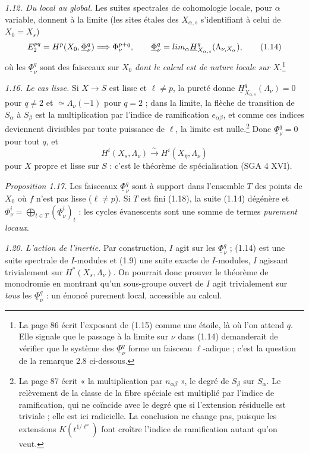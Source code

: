 \documentclass[11pt,a4paper]{article}
\begin{document}
\emph{1.12. Du local au global.} Les suites spectrales de cohomologie locale,
pour $\alpha$ variable, donnent à la limite (les sites étales des
$X_{\alpha,s}$ s'identifiant à celui de $X_0 = X_s$)
\[
  E_2^{pq} = H^p(X_0, \underline\Phi^q_\nu) \Longrightarrow \Phi^{p+q}_\nu, \qquad
  \underline\Phi^q_\nu = \varinjlim_\alpha \underline H^q_{X_{\alpha,s}}(\Lambda_{\nu, X_\alpha}) ,
  \tag{1.14}
\]
où les $\underline\Phi^q_\nu$ sont des faisceaux sur $X_0$ \emph{dont le calcul
est de nature locale sur $X$}.\footnote{La page 86 écrit l'exposant de (1.15)
comme une étoile, là où l'on attend $q$. Elle signale que le passage à la limite
sur $\nu$ dans (1.14) demanderait de vérifier que le système des
$\underline\Phi^q_\nu$ forme un faisceau $\ell$-adique ; c'est la question de
la remarque 2.8 ci-dessous.}

\emph{1.16. Le cas lisse.} Si $X \to S$ est lisse et $\ell \neq p$, la pureté
donne $\underline H^q_{X_{\alpha,s}}(\Lambda_\nu) = 0$ pour $q \neq 2$ et
$\simeq \Lambda_\nu(-1)$ pour $q = 2$ ; dans la limite, la flèche de transition
de $S_\alpha$ à $S_\beta$ est la multiplication par l'indice de ramification
$e_{\alpha\beta}$, et comme ces indices deviennent divisibles par toute
puissance de $\ell$, la limite est nulle.\footnote{La page 87 écrit « la
multiplication par $n_{\alpha\beta}$ », le degré de $S_\beta$ sur $S_\alpha$.
Le relèvement de la classe de la fibre spéciale est multiplié par l'indice de
ramification, qui ne coïncide avec le degré que si l'extension résiduelle est
triviale ; elle est ici radicielle. La conclusion ne change pas, puisque les
extensions $K(t^{1/\ell^n})$ font croître l'indice de ramification autant qu'on
veut.} Donc $\underline\Phi^q_\nu = 0$ pour tout $q$, et
\[
  H^i(X_s, \Lambda_\nu) \xrightarrow{\ \sim\ } H^i(X_{\bar\eta}, \Lambda_\nu)
\]
pour $X$ propre et lisse sur $S$ : c'est le théorème de spécialisation
(SGA 4 XVI).

\emph{Proposition 1.17.} Les faisceaux $\underline\Phi^q_\nu$ sont à support dans
l'ensemble $T$ des points de $X_0$ où $f$ n'est pas lisse ($\ell \neq p$). Si $T$
est fini (1.18), la suite (1.14) dégénère et $\Phi^i_\nu = \bigoplus_{t \in T}
(\underline\Phi^i_\nu)_t$ : les cycles évanescents sont une somme de termes
\emph{purement locaux}.

\emph{1.20. L'action de l'inertie.} Par construction, $I$ agit sur les
$\underline\Phi^q_\nu$ ; (1.14) est une suite spectrale de $I$-modules et (1.9)
une suite exacte de $I$-modules, $I$ agissant trivialement sur
$H^*(X_s, \Lambda_\nu)$. On pourrait donc prouver le théorème de monodromie en
montrant qu'un sous-groupe ouvert de $I$ agit trivialement sur \emph{tous} les
$\underline\Phi^q_\nu$ : un énoncé purement local, accessible au calcul.
\end{document}
